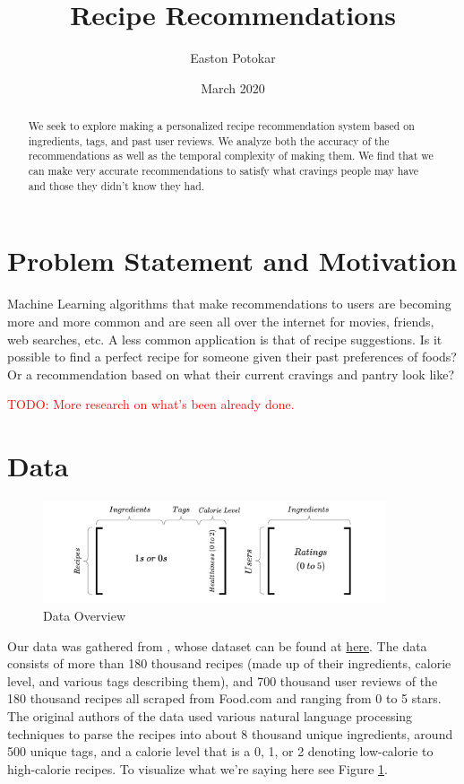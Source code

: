 \documentclass[11pt]{article}
\title{Recipe Recommendations}
\author{Easton Potokar}
\date{March 2020}
\newcommand\todo[1]{\textcolor{red}{TODO: #1 \\}}
\begin{document}
\maketitle

\begin{abstract}
    We seek to explore making a personalized recipe recommendation system based on ingredients, tags, and past user reviews. We analyze both the accuracy of the recommendations as well as the temporal complexity of making them. We find that we can make very accurate recommendations to satisfy what cravings people may have and those they didn't know they had.
\end{abstract}

\section{Problem Statement and Motivation}
Machine Learning algorithms that make recommendations to users are becoming more and more common and are seen all over the internet for movies, friends, web searches, etc. A less common application is that of recipe suggestions. Is it possible to find a perfect recipe for someone given their past preferences of foods? Or a recommendation based on what their current cravings and pantry look like? 

\todo{More research on what's been already done.}


\section{Data}
\begin{figure}[t]
\centering
\includegraphics[width=0.9\textwidth]{figs/data.pdf}
\caption{Data Overview}
\label{fig:data_overview}
\end{figure}

Our data was gathered from \cite{data}, whose dataset can be found at \href{https://www.kaggle.com/shuyangli94/food-com-recipes-and-user-interactions}{here}. The data consists of more than 180 thousand recipes (made up of their ingredients, calorie level, and various tags describing them), and 700 thousand user reviews of the 180 thousand recipes all scraped from Food.com  and ranging from 0 to 5 stars. The original authors of the data used various natural language processing techniques to parse the recipes into about 8 thousand unique ingredients, around 500 unique tags, and a calorie level that is a 0, 1, or 2 denoting low-calorie to high-calorie recipes. To visualize what we're saying here see Figure \ref{fig:data_overview}.
\end{document}
